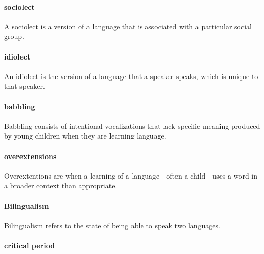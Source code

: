 \documentclass[
]{krantz}
\begin{document}
\hypertarget{sociolect}{%
\paragraph*{sociolect}\label{sociolect}}

A sociolect is a version of a language that is associated with a particular social group.

\hypertarget{idiolect}{%
\paragraph*{idiolect}\label{idiolect}}

An idiolect is the version of a language that a speaker speaks, which is unique to that speaker.

\hypertarget{babbling}{%
\paragraph*{babbling}\label{babbling}}

Babbling consists of intentional vocalizations that lack specific meaning produced by young children when they are learning language.

\hypertarget{overextensions}{%
\paragraph*{overextensions}\label{overextensions}}

Overextentions are when a learning of a language - often a child - uses a word in a broader context than appropriate.

\hypertarget{bilingualism-1}{%
\paragraph*{Bilingualism}\label{bilingualism-1}}

Bilingualism refers to the state of being able to speak two languages.

\hypertarget{critical-period}{%
\paragraph*{critical period}\label{critical-period}}
\end{document}
